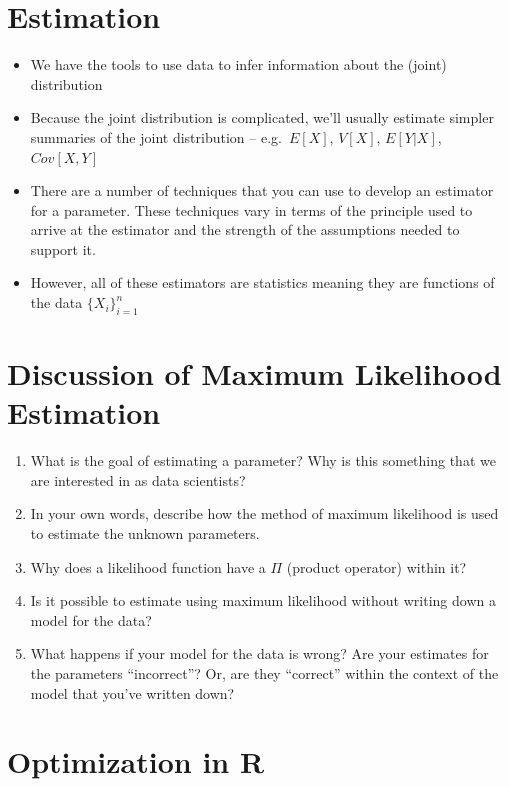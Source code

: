 \documentclass[
]{book}
\providecommand{\tightlist}{%
  \setlength{\itemsep}{0pt}\setlength{\parskip}{0pt}}
\theoremstyle{definition}
\theoremstyle{definition}
\theoremstyle{definition}
\theoremstyle{definition}
\theoremstyle{remark}
\begin{document}
\section{Estimation}\label{estimation-1}

\begin{itemize}
\item
  We have the tools to use data to infer information about the (joint) distribution
\item
  Because the joint distribution is complicated, we'll usually estimate simpler summaries of the joint distribution -- e.g.~\(E[X]\), \(V[X]\), \(E[Y|X]\), \(Cov[X,Y]\)
\item
  There are a number of techniques that you can use to develop an estimator for a parameter. These techniques vary in terms of the principle used to arrive at the estimator and the strength of the assumptions needed to support it.
\item
  However, all of these estimators are statistics meaning they are functions of the data \(\{X_i\}_{i=1}^n\)
\end{itemize}

\section{Discussion of Maximum Likelihood Estimation}\label{discussion-of-maximum-likelihood-estimation}

\begin{enumerate}
\def\labelenumi{\arabic{enumi}.}
\tightlist
\item
  What is the goal of estimating a parameter? Why is this something that we are interested in as data scientists?
\item
  In your own words, describe how the method of maximum likelihood is used to estimate the unknown parameters.
\item
  Why does a likelihood function have a \(\Pi\) (product operator) within it?
\item
  Is it possible to estimate using maximum likelihood without writing down a model for the data?
\item
  What happens if your model for the data is wrong? Are your estimates for the parameters ``incorrect''? Or, are they ``correct'' within the context of the model that you've written down?
\end{enumerate}

\section{Optimization in R}\label{optimization-in-r}
\end{document}
